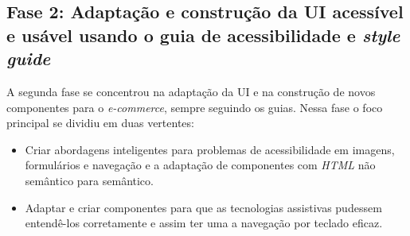 \subsection{Fase 2: Adaptação e construção da UI acessível e usável usando o guia de acessibilidade e \textit{style guide}}
{A segunda fase se concentrou na adaptação da UI e na construção de novos componentes para o \textit{e-commerce}, sempre seguindo os guias. Nessa fase o foco principal se dividiu em duas vertentes:
\begin{itemize}
\item Criar abordagens inteligentes para problemas de acessibilidade em imagens, formulários e navegação e a adaptação de componentes com \textit{HTML} não semântico para semântico.
\item  Adaptar e criar componentes para que as tecnologias assistivas pudessem entendê-los corretamente e assim ter uma a navegação por teclado eficaz.

\end{itemize}
}
